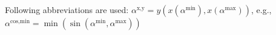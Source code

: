 \documentclass[journal]{IEEEtran}
\begin{document}


Following abbreviations are used: $\alpha^{\text{x,y}} = y(x(\alpha^{\text{min}}),x(\alpha^{\text{max}}))$, e.g., $\alpha^{\text{cos,min}} = \min(\sin(\alpha^{\text{min}},\alpha^{\text{max}}))$
\end{document}
